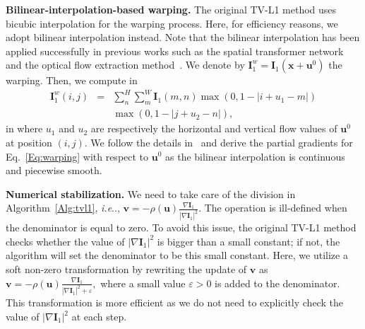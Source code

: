 \documentclass[10pt,twocolumn,letterpaper]{article}
\makeatletter
\DeclareRobustCommand\onedot{\futurelet\@let@token\@onedot}
\def\@onedot{\ifx\@let@token.\else.\null\fi\xspace}
\def\ie{\emph{i.e}\onedot} \def\Ie{\emph{I.e}\onedot}
\def\Vec#1{{\boldsymbol{#1}}}
\def\Mat#1{{\boldsymbol{#1}}}
\makeatother
\begin{document}
\textbf{Bilinear-interpolation-based warping.}
The original TV-L1 method uses bicubic interpolation for the warping process. Here, for efficiency reasons, we adopt bilinear interpolation instead. Note that the bilinear interpolation has been applied successfully in previous works such as the spatial transformer network~\cite{jaderberg2015spatial} and the optical flow extraction method~\cite{fischer2015flownet}. We denote by $\Mat{I}_1^w = \Mat{I}_1(\Vec{x}+\Vec{u}^0)$ the warping. Then, we compute
 in
\begin{eqnarray}
\label{Eq:warping}
\nonumber \Mat{I}_1^w(i,j) &=& \sum_{n}^H\sum_m^W \Mat{I}_1(m,n)\max(0,1-|i+u_1-m|)\\
&& \max(0,1-|j+u_2-n|),
\end{eqnarray}
 in \noindent
where $u_1$ and $u_2$ are respectively the horizontal and vertical flow values of $\Vec{u}^0$ at position $(i,j)$.
We  follow the details in~\cite{jaderberg2015spatial} and derive the partial gradients for Eq.~\eqref{Eq:warping} with respect to $\Vec{u}^0$ as the bilinear interpolation is continuous and piecewise smooth.

\textbf{Numerical stabilization.}
We need to take care of the division in Algorithm~\ref{Alg:tvl1}, \ie, $\Vec{v}=-\rho(\Vec{u})\frac{\nabla\Mat{I}_1}{|\nabla\Mat{I}_1|^2}$. The operation is ill-defined when the denominator is equal to zero.
To avoid this issue, the original TV-L1 method checks whether the value of $|\nabla\Mat{I}_1|^2$ is bigger than a small constant; if not, the algorithm will set the denominator to be this small constant.
Here, we utilize a soft non-zero transformation by rewriting the update of $\Vec{v}$ as
$
\Vec{v}=-\rho(\Vec{u})\frac{\nabla\Mat{I}_1}{|\nabla\Mat{I}_1|^2+\varepsilon},
$
where a small value $\varepsilon>0$ is added to the denominator. This transformation is more efficient as we do not need to explicitly check the value of $|\nabla\Mat{I}_1|^2$ at each step.
\end{document}
